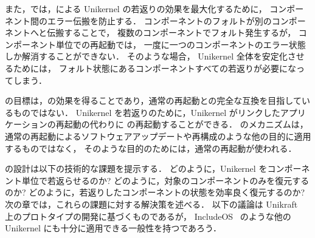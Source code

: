 また，\sysname では，\rr による Unikernel の若返りの効果を最大化するために，
コンポーネント間のエラー伝搬を防止する．
コンポーネントのフォルトが別のコンポーネントへと伝搬することで，
複数のコンポーネントでフォルト発生するが，
コンポーネント単位での再起動では，
一度に一つのコンポーネントのエラー状態しか解消することができない．
そのような場合，
Unikernel 全体を安定化させるためには，
フォルト状態にあるコンポーネントすべての若返りが必要になってしまう．



\sysname の目標は，\rr の効果を得ることであり，通常の再起動との完全な互換を目指しているものではない．
Unikernel を若返りのために，Unikernel がリンクしたアプリケーションの再起動の代わりに \sysname の再起動することができる．
\sysname のメカニズムは，
通常の再起動によるソフトウェアアップデートや再構成のような他の目的に適用するものではなく，
そのような目的のためには，通常の再起動が使われる．

\sysname の設計は以下の技術的な課題を提示する．
どのように，Unikernel をコンポーネント単位で若返らせるのか?
どのように，対象のコンポーネントのみを復元するのか?
どのように，若返りしたコンポーネントの状態を効率良く復元するのか?
次の章では，これらの課題に対する解決策を述べる．
以下の議論は Unikraft~\cite{KuenzerEtAl-Unikraft} 上のプロトタイプの開発に基づくものであるが，
IncludeOS~\cite{BratterudEtAl-IncludeOS} のような他の Unikernel にも十分に適用できる一般性を持つであろう．

